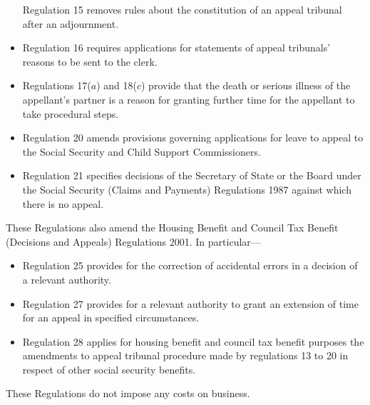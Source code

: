 \documentclass[12pt,a4paper]{article}
\begin{document}
\begin{itemize}
    Regulation 15 removes rules about the constitution of an appeal tribunal after an adjournment.
\item
    Regulation 16 requires applications for statements of appeal tribunals' reasons to be sent to the clerk.
\item
    Regulations 17($a$)  and 18($c$)  provide that the death or serious illness of the appellant’s partner is a reason for granting further time for the appellant to take procedural steps.
\item
    Regulation 20 amends provisions governing applications for leave to appeal to the Social Security and Child Support Commissioners.
\item
    Regulation 21 specifies decisions of the Secretary of State or the Board under the Social Security (Claims and Payments) Regulations 1987 against which there is no appeal. 
\end{itemize}

These Regulations also amend the Housing Benefit and Council Tax Benefit (Decisions and Appeals) Regulations 2001. In particular—
\begin{itemize}
\item    Regulation 25 provides for the correction of accidental errors in a decision of a relevant authority.
\item
    Regulation 27 provides for a relevant authority to grant an extension of time for an appeal in specified circumstances.
\item
    Regulation 28 applies for housing benefit and council tax benefit purposes the amendments to appeal tribunal procedure made by regulations 13 to 20 in respect of other social security benefits. 
\end{itemize}

These Regulations do not impose any costs on business. 
\end{document}
